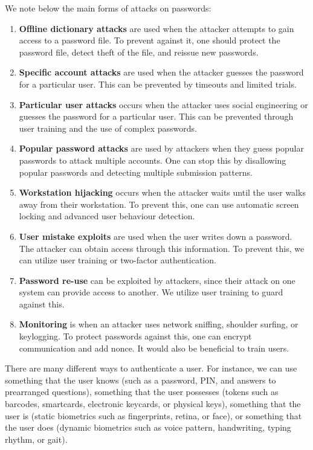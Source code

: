 \documentclass[11pt]{article}
\theoremstyle{plain} %
\theoremstyle{definition}
\theoremstyle{example}
\theoremstyle{remark}
\begin{document}
We note below the main forms of attacks on passwords:
\begin{enumerate}
	\item \textbf{Offline dictionary attacks} are used when the attacker attempts to gain access to a password file. To prevent against it, one should protect the password file, detect theft of the file, and reissue new passwords.
	\item \textbf{Specific account attacks} are used when the attacker guesses the password for a particular user. This can be prevented by timeouts and limited trials. 
	\item \textbf{Particular user attacks} occurs when the attacker uses social engineering or guesses the password for a particular user. This can be prevented through user training and the use of complex passwords.
	\item \textbf{Popular password attacks} are used by attackers when they guess popular passwords to attack multiple accounts. One can stop this by disallowing popular passwords and detecting multiple submission patterns. 
	\item \textbf{Workstation hijacking} occurs when the attacker waits until the user walks away from their workstation. To prevent this, one can use automatic screen locking and advanced user behaviour detection.
	\item \textbf{User mistake exploits} are used when the user writes down a password. The attacker can obtain access through this information. To prevent this, we can utilize user training or two-factor authentication.
	\item \textbf{Password re-use} can be exploited by attackers, since their attack on one system can provide access to another. We utilize user training to guard against this.
	\item \textbf{Monitoring} is when an attacker uses network sniffing, shoulder surfing, or keylogging. To protect passwords against this, one can encrypt communication and add nonce. It would also be beneficial to train users.  
\end{enumerate}

There are many different ways to authenticate a user. For instance, we can use something that the user knows (such as a password, PIN, and answers to prearranged questions), something that the user possesses (tokens such as barcodes, smartcards, electronic keycards, or physical keys), something that the user is (static biometrics such as fingerprints, retina, or face), or something that the user does (dynamic biometrics such as voice pattern, handwriting, typing rhythm, or gait). 
\end{document}
